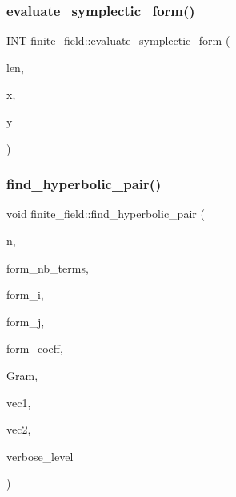 \subsubsection{\texorpdfstring{evaluate\+\_\+symplectic\+\_\+form()}{evaluate\_symplectic\_form()}}
{\footnotesize\ttfamily \mbox{\hyperlink{galois_8h_a09fddde158a3a20bd2dcadb609de11dc}{I\+NT}} finite\+\_\+field\+::evaluate\+\_\+symplectic\+\_\+form (\begin{DoxyParamCaption}\item[{\mbox{\hyperlink{galois_8h_a09fddde158a3a20bd2dcadb609de11dc}{I\+NT}}}]{len,  }\item[{\mbox{\hyperlink{galois_8h_a09fddde158a3a20bd2dcadb609de11dc}{I\+NT}} $\ast$}]{x,  }\item[{\mbox{\hyperlink{galois_8h_a09fddde158a3a20bd2dcadb609de11dc}{I\+NT}} $\ast$}]{y }\end{DoxyParamCaption})}

\mbox{\label{classfinite__field_a8702546f7248a1721647e856c6e153a2}} 
\subsubsection{\texorpdfstring{find\+\_\+hyperbolic\+\_\+pair()}{find\_hyperbolic\_pair()}}
{\footnotesize\ttfamily void finite\+\_\+field\+::find\+\_\+hyperbolic\+\_\+pair (\begin{DoxyParamCaption}\item[{\mbox{\hyperlink{galois_8h_a09fddde158a3a20bd2dcadb609de11dc}{I\+NT}}}]{n,  }\item[{\mbox{\hyperlink{galois_8h_a09fddde158a3a20bd2dcadb609de11dc}{I\+NT}}}]{form\+\_\+nb\+\_\+terms,  }\item[{\mbox{\hyperlink{galois_8h_a09fddde158a3a20bd2dcadb609de11dc}{I\+NT}} $\ast$}]{form\+\_\+i,  }\item[{\mbox{\hyperlink{galois_8h_a09fddde158a3a20bd2dcadb609de11dc}{I\+NT}} $\ast$}]{form\+\_\+j,  }\item[{\mbox{\hyperlink{galois_8h_a09fddde158a3a20bd2dcadb609de11dc}{I\+NT}} $\ast$}]{form\+\_\+coeff,  }\item[{\mbox{\hyperlink{galois_8h_a09fddde158a3a20bd2dcadb609de11dc}{I\+NT}} $\ast$}]{Gram,  }\item[{\mbox{\hyperlink{galois_8h_a09fddde158a3a20bd2dcadb609de11dc}{I\+NT}} $\ast$}]{vec1,  }\item[{\mbox{\hyperlink{galois_8h_a09fddde158a3a20bd2dcadb609de11dc}{I\+NT}} $\ast$}]{vec2,  }\item[{\mbox{\hyperlink{galois_8h_a09fddde158a3a20bd2dcadb609de11dc}{I\+NT}}}]{verbose\+\_\+level }\end{DoxyParamCaption})}

